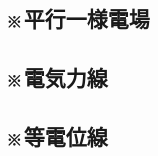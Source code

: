 \documentclass[../../../all/physics-standard_questions_all.tex]{subfiles}
\begin{document}
    \vspace{2cm}
    \vfill

\subsection{※平行一様電場}
    

    \vspace{2cm}
    \vfill

\subsection{※電気力線}
    

    \vspace{2cm}
    \vfill

\subsection{※等電位線}
    

    \vspace{2cm}
    \vfill
\end{document}
